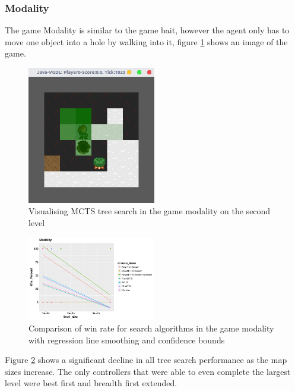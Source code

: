 \documentclass[journal]{IEEEtran}
\begin{document}
		\subsubsection{Modality}
		The game Modality is similar to the game bait, however the agent only has to move one object into a hole by walking into it, figure \ref{fig:MCTS-Locality} shows an image of the game.
		\begin{figure}[h]
		    \centering
		    \includegraphics[width=0.5\textwidth]{MCTS-Locality}
		    \caption{ Visualising MCTS tree search in the game modality on the second level}
		    \label{fig:MCTS-Locality}
		\end{figure}


		\begin{figure}[h]
		    \centering
		    \includegraphics[width=0.5\textwidth]{Scatter/game_16_win}
		    \caption{ Comparison of win rate for search algorithms in the game modality with regression line smoothing and confidence bounds}
		    \label{fig:game_16_win}
		\end{figure}
		Figure \ref{fig:game_16_win} shows a significant decline in all tree search performance as the map sizes increase.
		The only controllers that were able to even complete the largest level were best first and breadth first extended.
\end{document}
